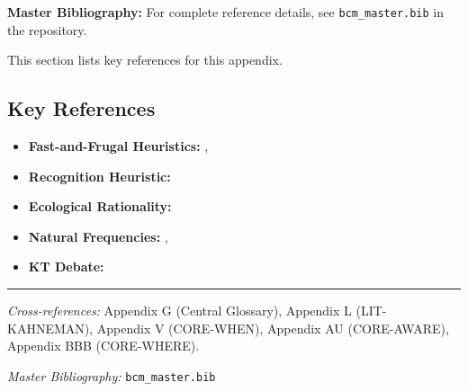\begin{tcolorbox}[colback=blue!5!white, colframe=blue!75!black]
\textbf{Master Bibliography:} For complete reference details, see
\texttt{bcm\_master.bib} in the repository.

This section lists key references for this appendix.
\end{tcolorbox}

\vspace{0.5em}

\subsection{Key References}

\begin{itemize}[nosep]
    \item \textbf{Fast-and-Frugal Heuristics:} \citet{PAP-gigerenzer1996fast}, \citet{PAP-gigerenzer1999simple}
    \item \textbf{Recognition Heuristic:} \citet{PAP-goldstein2002recognition}
    \item \textbf{Ecological Rationality:} \citet{gigerenzer2001bounded}
    \item \textbf{Natural Frequencies:} \citet{PAP-gigerenzer1995improve}, \citet{PAP-gigerenzer2012helping}
    \item \textbf{KT Debate:} \citet{PAP-gigerenzer1996narrow}
\end{itemize}

\nocite{bcm_master}



\vspace{1em}
\hrule
\vspace{0.5em}

\noindent\textit{Cross-references:}
Appendix G (Central Glossary),
Appendix L (LIT-KAHNEMAN),
Appendix V (CORE-WHEN),
Appendix AU (CORE-AWARE),
Appendix BBB (CORE-WHERE).

\noindent\textit{Master Bibliography:} \texttt{bcm\_master.bib}


